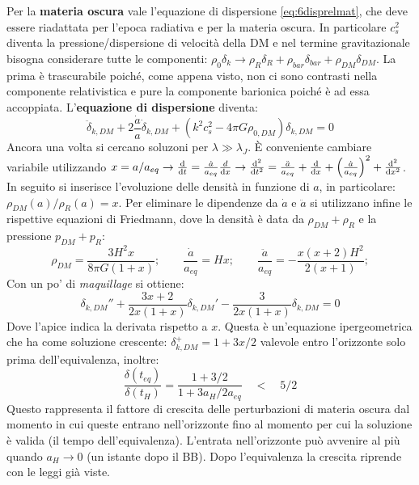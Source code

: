 \vspace{1em}
Per la \textbf{materia oscura} vale l'equazione di dispersione \ref{eq:6disprelmat}, che deve essere riadattata per l'epoca radiativa e per la materia oscura. In particolare $c_s^2$ diventa la pressione/dispersione di velocità della DM e nel termine gravitazionale bisogna considerare tutte le componenti: $\rho_0 \delta_k \rightarrow \rho_R\delta_R + \rho_{bar}\delta_{bar} + \rho_{DM}\delta_{DM} $. La prima è trascurabile poiché, come appena visto, non ci sono contrasti nella componente relativistica e pure la componente barionica poiché è ad essa accoppiata. L'\textbf{equazione di dispersione} diventa:
\begin{equation}
    \ddot{\delta}_{k,DM}+ 2 \frac{\dot{a}}{a}\dot{\delta}_{k,DM} + \left( k^2 c_s^2 -4\pi G \rho_{0,DM}\right)\delta_{k,DM}  =0
\end{equation}
Ancora una volta si cercano soluzoni per $\lambda \gg \lambda_J$. È conveniente cambiare variabile utilizzando $x=a/a_{eq}\rightarrow \frac{\d{}}{\d{t}}=\frac{\dot{a}}{a_{eq}}\frac{d{}}{\d{x}}\rightarrow \frac{\d{}^2}{\d{t^2}}=\frac{\ddot{a}}{a_{eq}}+\frac{\d{}}{\d{x}}+\left(\frac{\dot{a}}{a_{eq}}\right)^2 + \frac{\d{}^2}{\d{x^2}}$. In seguito si inserisce l'evoluzione delle densità in funzione di $a$, in particolare: $\rho_{DM} (a) / \rho_R(a) = x$. Per eliminare le dipendenze da $\dot{a}$ e $\ddot{a}$ si utilizzano infine le rispettive equazioni di Friedmann, dove la densità è data da $\rho_{DM}+\rho_{R}$ e la pressione $p_{DM}+p_R$:
\begin{equation*}
    \rho_{DM}=\frac{3H^2 x}{8\pi G (1+x)}; \qquad \frac{\dot{a}}{a_{eq}}=Hx; \qquad \frac{\ddot{a}}{a_{eq}}=-\frac{x(x+2)H^2}{2(x+1)};   
\end{equation*}
Con un po' di \textit{maquillage} si ottiene:
\begin{equation}
    \delta_{k,DM}'' + \frac{3x+2}{2x(1+x)}\delta_{k,DM}' - \frac{3}{2x(1+x)}\delta_{k,DM}=0
\end{equation}
Dove l'apice indica la derivata rispetto a $x$. Questa è un'equazione ipergeometrica che ha come soluzione crescente: $\delta_{k,DM}^+ = 1+3x/2$ valevole entro l'orizzonte  solo prima dell'equivalenza, inoltre:
\begin{equation}
    \frac{\delta (t_{eq})}{\delta(t_H)}=\frac{1+3/2}{1+3a_H/2a_{eq}} \quad < \quad 5/2
\end{equation}
Questo rappresenta il fattore di crescita delle perturbazioni di materia oscura dal momento in cui queste entrano nell'orizzonte fino al momento per cui la soluzione è valida (il tempo dell'equivalenza). L'entrata nell'orizzonte può avvenire al più quando $a_H\rightarrow 0$ (un istante dopo il BB). Dopo l'equivalenza la crescita riprende con le leggi già viste. 

